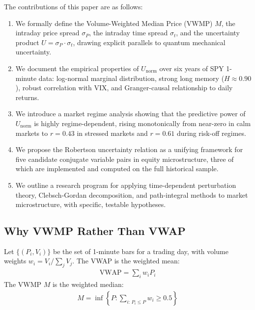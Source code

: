 \documentclass[preprint,12pt]{elsarticle}
\begin{document}
The contributions of this paper are as follows:

\begin{enumerate}
    \item We formally define the Volume-Weighted Median Price (VWMP) $M$, the intraday price spread $\sigma_P$, the intraday time spread $\sigma_t$, and the uncertainty product $U = \sigma_P \cdot \sigma_t$, drawing explicit parallels to quantum mechanical uncertainty.

    \item We document the empirical properties of $U_\mathrm{norm}$ over six years of SPY 1-minute data: log-normal marginal distribution, strong long memory ($H \approx 0.90$), robust correlation with VIX, and Granger-causal relationship to daily returns.

    \item We introduce a market regime analysis showing that the predictive power of $U_\mathrm{norm}$ is highly regime-dependent, rising monotonically from near-zero in calm markets to $r = 0.43$ in stressed markets and $r = 0.61$ during risk-off regimes.

    \item We propose the Robertson uncertainty relation as a unifying framework for five candidate conjugate variable pairs in equity microstructure, three of which are implemented and computed on the full historical sample.

    \item We outline a research program for applying time-dependent perturbation theory, Clebsch-Gordan decomposition, and path-integral methods to market microstructure, with specific, testable hypotheses.
\end{enumerate}

\subsection{Why VWMP Rather Than VWAP}

Let $\{(P_i, V_i)\}$ be the set of 1-minute bars for a trading day, with volume weights $w_i = V_i / \sum_j V_j$. The VWAP is the weighted mean:
\begin{align}
    \mathrm{VWAP} = \sum_i w_i P_i
\end{align}
The VWMP $M$ is the weighted median:
\begin{align}
    M = \inf\left\{P : \sum_{i:\, P_i \leq P} w_i \geq 0.5\right\}
\end{align}
\end{document}
